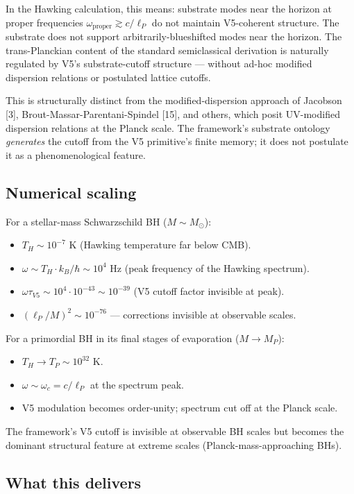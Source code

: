 \documentclass[11pt,a4paper]{article}
\begin{document}
In the Hawking calculation, this means: substrate modes near the horizon at proper frequencies $\omega_\mathrm{proper} \gtrsim c/\ell_P$ do not maintain V5-coherent structure. The substrate does not support arbitrarily-blueshifted modes near the horizon. The trans-Planckian content of the standard semiclassical derivation is naturally regulated by V5's substrate-cutoff structure --- without ad-hoc modified dispersion relations or postulated lattice cutoffs.

This is structurally distinct from the modified-dispersion approach of Jacobson [3], Brout-Massar-Parentani-Spindel [15], and others, which posit UV-modified dispersion relations at the Planck scale. The framework's substrate ontology \emph{generates} the cutoff from the V5 primitive's finite memory; it does not postulate it as a phenomenological feature.

\subsection{Numerical scaling}

For a stellar-mass Schwarzschild BH ($M \sim M_\odot$):
\begin{itemize}[noitemsep]
\item $T_H \sim 10^{-7}$ K (Hawking temperature far below CMB).
\item $\omega \sim T_H \cdot k_B/\hbar \sim 10^{4}$ Hz (peak frequency of the Hawking spectrum).
\item $\omega\tau_{V5} \sim 10^{4} \cdot 10^{-43} \sim 10^{-39}$ (V5 cutoff factor invisible at peak).
\item $(\ell_P/M)^{2} \sim 10^{-76}$ --- corrections invisible at observable scales.
\end{itemize}

For a primordial BH in its final stages of evaporation ($M \to M_P$):
\begin{itemize}[noitemsep]
\item $T_H \to T_P \sim 10^{32}$ K.
\item $\omega \sim \omega_c = c/\ell_P$ at the spectrum peak.
\item V5 modulation becomes order-unity; spectrum cut off at the Planck scale.
\end{itemize}

The framework's V5 cutoff is invisible at observable BH scales but becomes the dominant structural feature at extreme scales (Planck-mass-approaching BHs).

\subsection{What this delivers}
\end{document}
